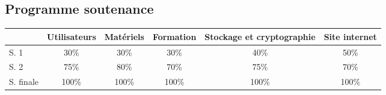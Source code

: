 \subsection{Programme soutenance}

\begin{table}[h]
\begin{tabular}{l|c|c|c|c|c|}
\cline{2-6}
\multicolumn{1}{c|}{}                   &  Utilisateurs & Matériels & Formation & Stockage et cryptographie & Site internet \\ \hline
\multicolumn{1}{|l|}{S. 1}      & 30\%                 & 30\%                              & 30\%                    & 40\%                                  & 50\%          \\ \hline
\multicolumn{1}{|l|}{S. 2}      & 75\%                 & 80\%                              & 70\%                    & 75\%                                  & 70\%          \\ \hline
\multicolumn{1}{|l|}{S. finale} & 100\%                & 100\%                             & 100\%                   & 100\%                                 & 100\%         \\ \hline
\end{tabular}
\end{table}